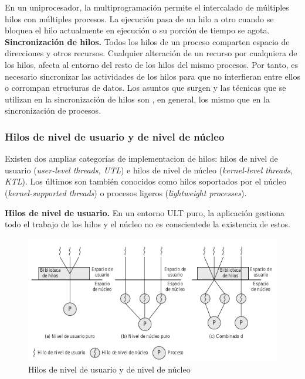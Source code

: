 \documentclass{article}
\begin{document}
					En un uniprocesador, la multiprogramación permite el intercalado de múltiples hilos con múltiples procesos. La ejecución pasa de un hilo a otro cuando se bloquea el hilo actualmente en ejecución o su porción de tiempo se agota. \\
					\textbf{Sincronización de hilos.} Todos los hilos de un proceso comparten espacio de direcciones y otros recursos. Cualquier alteración de un recurso por cualquiera de los hilos, afecta al entorno del resto de los hilos del mismo procesos. Por tanto, es necesario sincronizar las actividades de los hilos para que no interfieran entre ellos o corrompan etructuras de datos. Los asuntos que surgen y las técnicas que se utilizan en la sincronización de hilos son , en general, los mismo que en la sincronización de procesos.
					
				\subsubsection{Hilos de nivel de usuario y de nivel de núcleo}
					Existen dos amplias categorías de implementacion de hilos: hilos de nivel de usuario (\textit{user-level threads, UTL}) e hilos de nivel de núcleo (\textit{kernel-level threads, KTL}). Los últimos son también conocidos como hilos soportados por el núcleo (\textit{kernel-supported threads}) o procesos ligeros (\textit{lightweight processes}).
					
					\textbf{Hilos de nivel de usuario.} En un entorno ULT puro, la aplicación gestiona todo el trabajo de los hilos y el núcleo no es conscientede la existencia de estos.
					
					\begin{figure}
					\caption{Hilos de nivel de usuario y de nivel de núcleo}
					\label{figura2.18:hilosUK}
					\centering
					\includegraphics[width=1\textwidth, scale=1]{tema_2_figura18.png}
					\end{figure}
					
\end{document}
